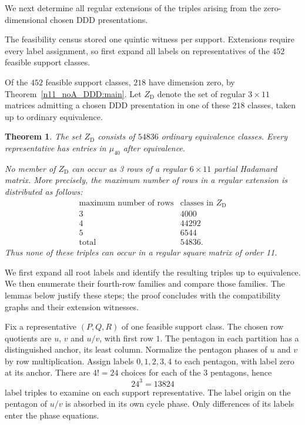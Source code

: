 \documentclass[11pt,a4paper]{article}
\newtheorem{theorem}{Theorem}[section]
\theoremstyle{plain}
\theoremstyle{definition}
\theoremstyle{plain}
\begin{document}
We next determine all regular extensions of the triples arising from the zero-dimensional chosen $\mathrm{DDD}$ presentations.

The feasibility census stored one quintic witness per support. Extensions require every label assignment, so first expand all labels on representatives of the $452$ feasible support classes.

Of the $452$ feasible support classes, $218$ have dimension zero, by Theorem~\ref{n11_noA_DDD:main}. Let $Z_{\mathrm D}$ denote the set of regular $3\times11$ matrices admitting a chosen $\mathrm{DDD}$ presentation in one of these $218$ classes, taken up to ordinary equivalence. 

\par\addvspace{\medskipamount}\noindent
\begin{minipage}{\linewidth}
\begin{theorem}\label{n11_fourth:main}
The set $Z_{\mathrm D}$ consists of $54836$ ordinary equivalence classes. Every representative has entries in $\mu_{40}$ after equivalence.

No member of $Z_{\mathrm D}$ can occur as 3 rows of a regular $6\times11$ partial Hadamard matrix. More precisely, the maximum number of rows in a regular extension is distributed as follows:
$$\begin{array}{c|r}
\text{maximum number of rows}&\text{classes in }Z_{\mathrm D}\\\hline
3&4000\\
4&44292\\
5&6544\\\hline
\text{total}&54836.
\end{array}$$
Thus none of these triples can occur in a regular square matrix of order 11.
\end{theorem}
\end{minipage}
\par\addvspace{\medskipamount}

We first expand all root labels and identify the resulting triples up to equivalence. We then enumerate their fourth-row families and compare those families. The lemmas below justify these steps; the proof concludes with the compatibility graphs and their extension witnesses.

\medskip
Fix a representative $(P,Q,R)$ of one feasible support class. The chosen row quotients are $u$, $v$ and $u/v$, with first row $1$. The pentagon in each partition has a distinguished anchor, its least column. Normalize the pentagon phases of $u$ and $v$ by row multiplication. Assign labels $0,1,2,3,4$ to each pentagon, with label zero at its anchor. There are $4!=24$ choices for each of the 3 pentagons, hence
$$24^3=13824$$
label triples to examine on each support representative. The label origin on the pentagon of $u/v$ is absorbed in its own cycle phase. Only differences of its labels enter the phase equations.
\end{document}
